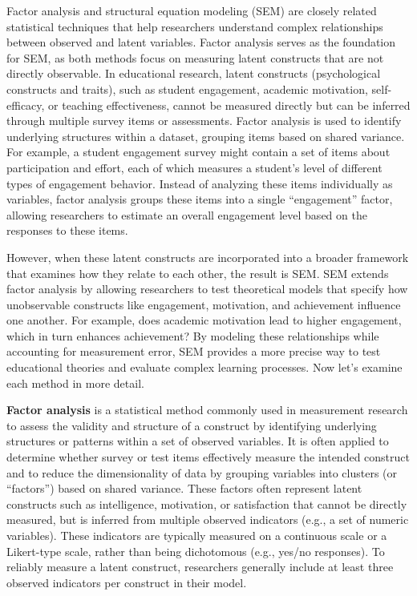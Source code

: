 \documentclass[
  letterpaper,
  DIV=11,
  numbers=noendperiod]{scrreprt}
\begin{document}
Factor analysis and structural equation modeling (SEM) are closely
related statistical techniques that help researchers understand complex
relationships between observed and latent variables. Factor analysis
serves as the foundation for SEM, as both methods focus on measuring
latent constructs that are not directly observable. In educational
research, latent constructs (psychological constructs and traits), such
as student engagement, academic motivation, self-efficacy, or teaching
effectiveness, cannot be measured directly but can be inferred through
multiple survey items or assessments. Factor analysis is used to
identify underlying structures within a dataset, grouping items based on
shared variance. For example, a student engagement survey might contain
a set of items about participation and effort, each of which measures a
student's level of different types of engagement behavior. Instead of
analyzing these items individually as variables, factor analysis groups
these items into a single ``engagement'' factor, allowing researchers to
estimate an overall engagement level based on the responses to these
items.

However, when these latent constructs are incorporated into a broader
framework that examines how they relate to each other, the result is
SEM. SEM extends factor analysis by allowing researchers to test
theoretical models that specify how unobservable constructs like
engagement, motivation, and achievement influence one another. For
example, does academic motivation lead to higher engagement, which in
turn enhances achievement? By modeling these relationships while
accounting for measurement error, SEM provides a more precise way to
test educational theories and evaluate complex learning processes. Now
let's examine each method in more detail.

\textbf{Factor analysis} is a statistical method commonly used in
measurement research to assess the validity and structure of a construct
by identifying underlying structures or patterns within a set of
observed variables. It is often applied to determine whether survey or
test items effectively measure the intended construct and to reduce the
dimensionality of data by grouping variables into clusters (or
``factors'') based on shared variance. These factors often represent
latent constructs such as intelligence, motivation, or satisfaction that
cannot be directly measured, but is inferred from multiple observed
indicators (e.g., a set of numeric variables). These indicators are
typically measured on a continuous scale or a Likert-type scale, rather
than being dichotomous (e.g., yes/no responses). To reliably measure a
latent construct, researchers generally include at least three observed
indicators per construct in their model.
\end{document}
